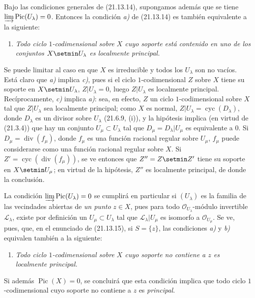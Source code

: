 \begin{remark}[21.13.16]
\label{IV.21.13.16}
Bajo las condiciones generales de (21.13.14), supongamos además que se tiene
$\varinjlim\operatorname{Pic}(U_\lambda)=0$. Entonces la condición \emph{a)} de (21.13.14)
es también equivalente a la siguiente:
\begin{enumerate}
  \item[c)] \emph{Todo ciclo $1$-codimensional sobre $X$ cuyo soporte está contenido
  en uno de los conjuntos $X\setmin U_\lambda$ es localmente principal.}
\end{enumerate}

Se puede limitar al caso en que $X$ es irreducible y todos los $U_\lambda$ son no
vacíos. Está claro que \emph{a)} implica \emph{c)}, pues si el ciclo $1$-codimensional $Z$ sobre
$X$ tiene su soporte en $X\setmin U_\lambda$, $Z|U_\lambda=0$, luego $Z|U_\lambda$ es
localmente principal. Recíprocamente, \emph{c)} implica \emph{a)}: sea, en efecto, $Z$ un ciclo
$1$-codimensional sobre $X$ tal que $Z|U_\lambda$ sea localmente principal; como $X$
es normal, $Z|U_\lambda=\operatorname{cyc}(D_\lambda)$, donde $D_\lambda$ es un
divisor sobre $U_\lambda$ (21.6.9, (i)), y la hipótesis implica (en virtud de
(21.3.4)) que hay un conjunto $U_\mu\subset U_\lambda$ tal que
$D_\mu=D_\lambda|U_\mu$ es equivalente a $0$. Si
$D_\mu=\operatorname{div}(f_\mu)$, donde $f_\mu$ es una función racional regular
sobre $U_\mu$, $f_\mu$ puede considerarse como una función racional regular
sobre $X$. Si $Z'=\operatorname{cyc}(\operatorname{div}(f_\mu))$, se ve entonces que
$Z''=Z\setmin Z'$ tiene su soporte en $X\setmin U_\mu$; en virtud de la hipótesis, $Z''$ es
localmente principal, de donde la conclusión.

La condición $\varinjlim\operatorname{Pic}(U_\lambda)=0$ se cumplirá en particular
si $(U_\lambda)$ es la familia de las vecindades abiertas de \emph{un punto} $z\in X$,
pues para todo $\mathcal O_{U_\lambda}$-módulo invertible $\mathscr L_\lambda$, existe
por definición un $U_\mu\subset U_\lambda$ tal que
$\mathscr L_\lambda|U_\mu$ es isomorfo a $\mathcal O_{U_\mu}$. Se ve, pues, que,
en el enunciado de (21.13.15), si $S=\{z\}$, las condiciones \emph{a)} y \emph{b)} equivalen
también a la siguiente:
\begin{enumerate}
  \item[c)] \emph{Todo ciclo $1$-codimensional sobre $X$ cuyo soporte no contiene
  a $z$ es localmente principal.}
\end{enumerate}
Si además $\operatorname{Pic}(X)=0$, se concluirá que esta condición implica que
todo ciclo $1$-codimensional cuyo soporte no contiene a $z$ es \emph{principal}.
\end{remark}
